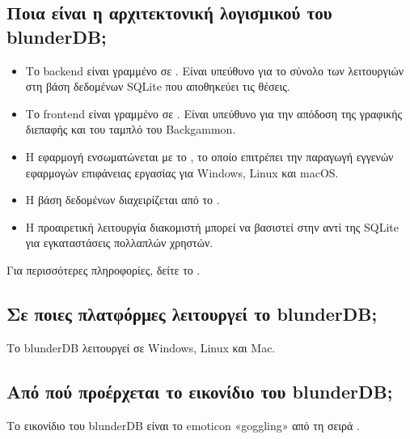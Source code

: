 \documentclass[letterpaper,10pt,greek]{sphinxmanual}
\begin{document}
\subsection{Ποια είναι η αρχιτεκτονική λογισμικού του blunderDB;}
\label{\detokenize{faq:quel-est-l-architecture-logicielle-de-blunderdb}}\begin{itemize}
\item {} 
\sphinxAtStartPar
Το backend είναι γραμμένο σε . Είναι υπεύθυνο για το σύνολο των λειτουργιών στη βάση δεδομένων SQLite που αποθηκεύει τις θέσεις.

\item {} 
\sphinxAtStartPar
Το frontend είναι γραμμένο σε . Είναι υπεύθυνο για την απόδοση της γραφικής διεπαφής και του ταμπλό του Backgammon.

\item {} 
\sphinxAtStartPar
Η εφαρμογή ενσωματώνεται με το , το οποίο επιτρέπει την παραγωγή εγγενών εφαρμογών επιφάνειας εργασίας για Windows, Linux και macOS.

\item {} 
\sphinxAtStartPar
Η βάση δεδομένων διαχειρίζεται από το .

\item {} 
\sphinxAtStartPar
Η προαιρετική λειτουργία διακομιστή μπορεί να βασιστεί στην  αντί της SQLite για εγκαταστάσεις πολλαπλών χρηστών.

\end{itemize}

\sphinxAtStartPar
Για περισσότερες πληροφορίες, δείτε το .


\subsection{Σε ποιες πλατφόρμες λειτουργεί το blunderDB;}
\label{\detokenize{faq:sur-quelles-plateformes-blunderdb-fonctionne-t-il}}
\sphinxAtStartPar
Το blunderDB λειτουργεί σε Windows, Linux και Mac.


\subsection{Από πού προέρχεται το εικονίδιο του blunderDB;}
\label{\detokenize{faq:d-ou-vient-l-icone-de-blunderdb}}
\sphinxAtStartPar
Το εικονίδιο του blunderDB είναι το emoticon «goggling» από τη σειρά .
\end{document}
